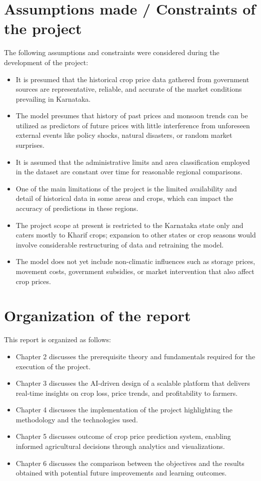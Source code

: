 \section[Assumptions made / Constraints of the project]{\textbf{Assumptions made / Constraints of the project}}

The following assumptions and constraints were considered during the development of the project:

\begin{itemize}
	\item It is presumed that the historical crop price data gathered from government sources are representative, reliable, and accurate of the market conditions prevailing in Karnataka.
	\item The model presumes that history of past prices and monsoon trends can be utilized as predictors of future prices with little interference from unforeseen external events like policy shocks, natural disasters, or random market surprises.
	\item It is assumed that the administrative limits and area classification employed in the dataset are constant over time for reasonable regional comparisons.
	\item One of the main limitations of the project is the limited availability and detail of historical data in some areas and crops, which can impact the accuracy of predictions in these regions.
	\item The project scope at present is restricted to the Karnataka state only and caters mostly to Kharif crops; expansion to other states or crop seasons would involve considerable restructuring of data and retraining the model.
	\item The model does not yet include non-climatic influences such as storage prices, movement costs, government subsidies, or market intervention that also affect crop prices.
\end{itemize}

\section[Organization of the report]{\textbf{Organization of the report}}

This report is organized as follows:
\begin{itemize}
	\item Chapter 2 discusses the prerequisite theory and fundamentals required for the execution of the project.
	\item Chapter 3 discusses the AI-driven design of a scalable platform that delivers real-time insights on crop loss, price trends, and profitability to farmers.
	\item Chapter 4 discusses the implementation of the project highlighting the methodology and the technologies used.
	\item Chapter 5 discusses outcome of crop price prediction system, enabling informed agricultural decisions through analytics and visualizations.
	\item Chapter 6 discusses the comparison between the objectives and the results obtained with potential future improvements and learning outcomes.
\end{itemize}